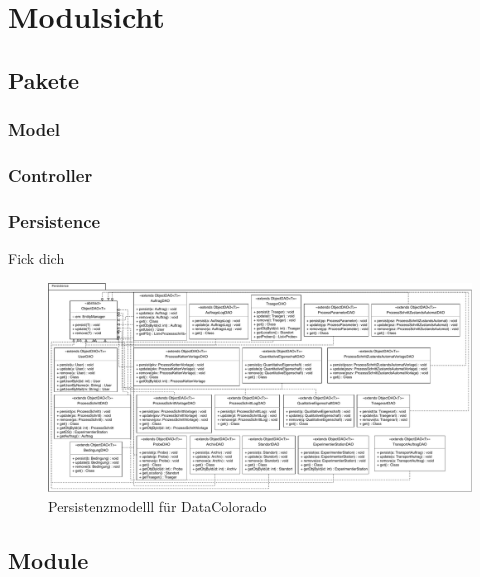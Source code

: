 \documentclass[enabledeprecatedfontcommands,fontsize=12pt,paper=a4,twoside]{scrartcl}
\begin{document}
\section{Modulsicht}
\label{sec:modulsicht}

\subsection{Pakete}

\subsubsection{Model}

\subsubsection{Controller}

\subsubsection{Persistence}
Fick dich
 \begin{figure}
  \caption{Persistenzmodelll für DataColorado}
  \centering
  \includegraphics[width=\textwidth]{UML/Persistence}
 \end{figure}

\subsection{Module}
\end{document}
